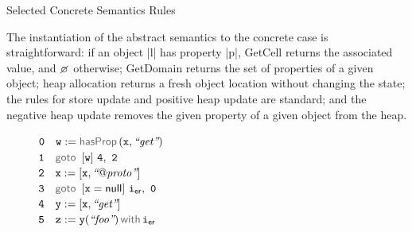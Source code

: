 \begin{display}{Selected Concrete Semantics Rules}
{{\begin{mathpar}
  \end{mathpar}
  }}
 \end{display}

The instantiation of the \jsil abstract semantics to the concrete case is straightforward: if an object \jsinline|l| has property \jsinline|p|, GetCell returns the associated value, and $\none$ otherwise; GetDomain returns the set of properties of a given object;
heap allocation returns a fresh object location without changing the state;
the rules for store update and positive heap update are standard; and 
the negative heap update removes the given property of a given object from the heap.



\begin{figure}
\vspace*{-0.24cm}
{\small
\hspace*{-0.5cm} $\mathtt{0\quad w := \hasfield(x, \litstring{get})}$ \\
\hspace*{-0.5cm} $\mathtt{1\quad \ifgoto{w}{4}{2}}$ \\
\hspace*{-0.5cm} $\mathtt{2\quad x := [x, \litstring{\protop}] }$ \\ 
\hspace*{-0.5cm} $\mathtt{3\quad \ifgoto{x = \jnull}{\errlab}{0}}$ \\
\hspace*{-0.5cm} $\mathtt{4\quad y := [x, \litstring{get}]}$ \\
\hspace*{-0.5cm} $\mathtt{5\quad \jsilcall{z}{y}{\litstring{foo}}{\errlab}}$ 
}
\vspace*{-0.2cm}
\end{figure}




